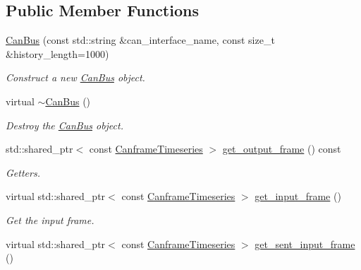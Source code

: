 \subsection*{Public Member Functions}
\begin{DoxyCompactItemize}
\item 
\hyperlink{classblmc__drivers_1_1CanBus_a7d376f1ebd6dd8bc3299f6fc9f3d42c6}{Can\+Bus} (const std\+::string \&can\+\_\+interface\+\_\+name, const size\+\_\+t \&history\+\_\+length=1000)
\begin{DoxyCompactList}\small\item\em Construct a new \hyperlink{classblmc__drivers_1_1CanBus}{Can\+Bus} object. \end{DoxyCompactList}\item 
\mbox{\label{classblmc__drivers_1_1CanBus_aa79afdda8d7f28ea63d32bf1a5a0f196}} 
virtual \hyperlink{classblmc__drivers_1_1CanBus_aa79afdda8d7f28ea63d32bf1a5a0f196}{$\sim$\+Can\+Bus} ()
\begin{DoxyCompactList}\small\item\em Destroy the \hyperlink{classblmc__drivers_1_1CanBus}{Can\+Bus} object. \end{DoxyCompactList}\item 
std\+::shared\+\_\+ptr$<$ const \hyperlink{classblmc__drivers_1_1CanBusInterface_a2da2627c961927f48359ae7d7e1aa4da}{Canframe\+Timeseries} $>$ \hyperlink{classblmc__drivers_1_1CanBus_a449fa3c1b73a9282193ce85b56e9a729}{get\+\_\+output\+\_\+frame} () const
\begin{DoxyCompactList}\small\item\em Getters. \end{DoxyCompactList}\item 
virtual std\+::shared\+\_\+ptr$<$ const \hyperlink{classblmc__drivers_1_1CanBusInterface_a2da2627c961927f48359ae7d7e1aa4da}{Canframe\+Timeseries} $>$ \hyperlink{classblmc__drivers_1_1CanBus_a5b9282bc65bff196e6d6b393fbdc5891}{get\+\_\+input\+\_\+frame} ()
\begin{DoxyCompactList}\small\item\em Get the input frame. \end{DoxyCompactList}\item 
virtual std\+::shared\+\_\+ptr$<$ const \hyperlink{classblmc__drivers_1_1CanBusInterface_a2da2627c961927f48359ae7d7e1aa4da}{Canframe\+Timeseries} $>$ \hyperlink{classblmc__drivers_1_1CanBus_a862e9898a6607ac2e00e712c30e7f348}{get\+\_\+sent\+\_\+input\+\_\+frame} ()

\end{DoxyCompactItemize}

